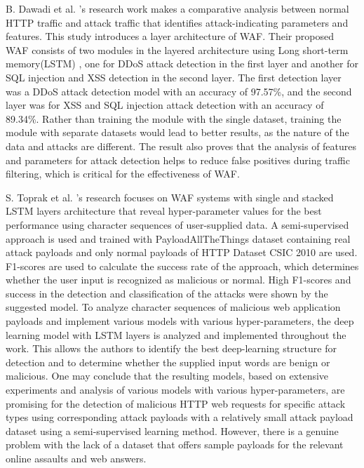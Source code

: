 B. Dawadi et al. \cite{Dawadi}'s research work makes a comparative analysis between normal HTTP traffic and attack traffic that identifies attack-indicating parameters and features. This study introduces a layer architecture of WAF. Their proposed WAF consists of two modules in the layered architecture using Long short-term memory(LSTM) , one for DDoS attack detection in the first layer and another for SQL injection and XSS detection in the second layer. The first detection layer was a DDoS attack detection model with an accuracy of 97.57\%, and the second layer was for XSS and SQL injection attack detection with an accuracy of 89.34\%. Rather than training the module with the single dataset, training the module with separate datasets would lead to better results, as the nature of the data and attacks are different. The result also proves that the analysis of features and parameters for attack detection helps to reduce false positives during traffic filtering, which is critical for the effectiveness of WAF.


S. Toprak et al. \cite{Toprak}'s research focuses on WAF systems with single and stacked LSTM layers architecture that reveal hyper-parameter values for the best performance using character sequences of user-supplied data. A semi-supervised approach is used and trained with PayloadAllTheThings dataset containing real attack payloads and only normal payloads of HTTP Dataset CSIC 2010 are used. F1-scores are used to calculate the success rate of the approach, which determines whether the user input is recognized as malicious or normal. High F1-scores and success in the detection and classification of the attacks were shown by the suggested model.
To analyze character sequences of malicious web application payloads and implement various models with various hyper-parameters, the deep learning model with LSTM layers is analyzed and implemented throughout the work. This allows the authors to identify the best deep-learning structure for detection and to determine whether the supplied input words are benign or malicious. One may conclude that the resulting models, based on extensive experiments and analysis of various models with various hyper-parameters, are promising for the detection of malicious HTTP web requests for specific attack types using corresponding attack payloads with a relatively small attack payload dataset using a semi-supervised learning method. However, there is a genuine problem with the lack of a dataset that offers sample payloads for the relevant online assaults and web answers.

